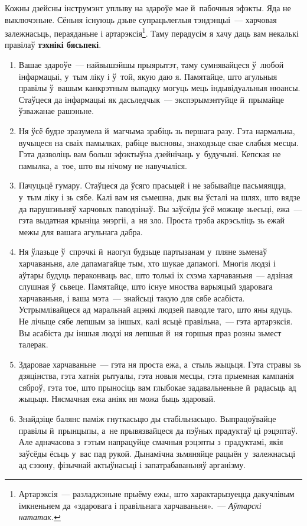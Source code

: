 \enlargethispage{\baselineskip}
Кожны дзейсны інструмэнт уплыву на здароўе мае й~пабочныя эфэкты. Яда не выключэньне. Сёньня існуюць дзьве супрацьлеглыя тэндэнцыі~--- харчовая залежнасьць, пераяданьне і артарэксія\footnote{Артарэксія~--- разладжэньне прыёму ежы, што характарызуецца дакучлівым імкненьнем да «здаровага і правільнага харчаваньня».~--- \emph{Аўтарскі нататак.}}. Таму перадусім я хачу даць вам некалькі правілаў \textbf{тэхнікі бясьпекі}.
\begin{enumerate}[itemindent=3em,labelwidth=1.5em,leftmargin=0pt,nosep]
  \item Вашае здароўе~--- найвышэйшы прыярытэт, таму сумнявайцеся ў~любой інфармацыі, у~тым ліку і ў~той, якую даю я. Памятайце, што агульныя правілы ў~вашым канкрэтным выпадку могуць мець індывідуальныя нюансы. Стаўцеся да інфармацыі як дасьледчык~--- экспэрымэнтуйце й~прымайце ўзважанае рашэньне.
  \item Ня ўсё будзе зразумела й~магчыма зрабіць зь першага разу. Гэта нармальна, вучыцеся на сваіх памылках, рабіце высновы, знаходзьце свае слабыя месцы. Гэта дазволіць вам больш эфэктыўна дзейнічаць у~будучыні. Кепская не памылка, а~тое, што вы нічому не навучыліся.
  \item Пачуцьцё гумару. Стаўцеся да ўсяго прасьцей і не забывайце пасьмяяцца, у~тым ліку і зь сябе. Калі вам ня сьмешна, дык вы ўсталі на шлях, што вядзе да парушэньняў харчовых паводзінаў. Вы заўсёды ўсё можаце зьесьці, ежа~--- гэта выдатная крыніца энэргіі, а~ня зло. Проста трэба акрэсьліць зь ежай межы для вашага агульнага дабра.
  \item Ня ўлазьце ў~спрэчкі й~наогул будзьце партызанам у~пляне зьменаў харчаваньня, але дапамагайце тым, хто шукае дапамогі. Многія людзі і аўтары будуць пераконваць вас, што толькі іх схэма харчаваньня~--- адзіная слушная ў~сьвеце. Памятайце, што існуе мноства варыяцый здаровага харчаваньня, і ваша мэта~--- знайсьці такую для сябе асабіста. Устрымлівайцеся ад маральнай ацэнкі людзей паводле таго, што яны ядуць. Не лічыце сябе лепшым за іншых, калі ясьцё правільна,~--- гэта артарэксія. Вы асабіста ды іншыя людзі ня лепшыя й~ня горшыя праз розны зьмест талерак.
  \item Здаровае харчаваньне~--- гэта ня проста ежа, а~стыль жыцьця. Гэта стравы зь дзяцінства, гэта хатнія рытуалы, гэта новыя месцы, гэта прыемная кампанія сяброў, гэта тое, што прыносіць вам глыбокае задавальненьне й~радасьць ад жыцьця. Нясмачная ежа аніяк ня можа быць здаровай.
  \item Знайдзіце балянс паміж гнуткасьцю ды стабільнасьцю. Выпрацоўвайце правілы й~прынцыпы, а~не прывязвайцеся да пэўных прадуктаў ці рэцэптаў. Але адначасова з~гэтым напрацуйце смачныя рэцэпты з~прадуктамі, якія заўсёды ёсьць у~вас пад рукой. Дынамічна зьмяняйце рацыён у~залежнасьці ад сэзону, фізычнай актыўнасьці і запатрабаваньняў арганізму.

\end{enumerate}
